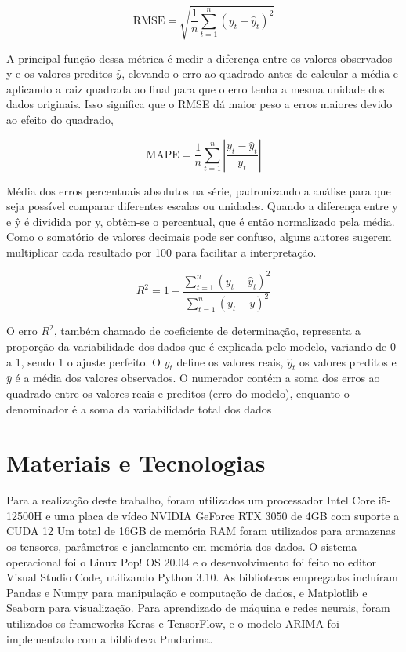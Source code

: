 \begin{equation}
    \text{RMSE} = \sqrt{\frac{1}{n} \sum_{t=1}^{n} (y_t - \hat{y}_t)^2}
\end{equation}

A principal função dessa métrica é medir a diferença entre os valores observados 
y e os valores preditos $\hat{y}$, elevando o erro ao quadrado antes de calcular a média e aplicando a raiz quadrada ao final para que o erro tenha a mesma unidade dos dados originais. Isso significa que o RMSE dá maior peso a erros maiores devido ao efeito do quadrado,

\begin{equation}
    \text{MAPE} = \frac{1}{n} \sum_{t=1}^{n} \left|\frac{y_t - \hat{y}_t}{y_t}\right|
\end{equation}

Média dos erros percentuais absolutos na série, padronizando a análise para que seja possível comparar diferentes escalas ou unidades.
Quando a diferença entre y e ŷ é dividida por y, obtêm-se o percentual, que é então normalizado pela média. Como o somatório de valores decimais pode ser confuso, alguns autores sugerem multiplicar cada resultado por 100 para facilitar a interpretação.

\begin{equation}
    R^2 = 1 - \frac{\sum_{t=1}^{n} (y_t - \hat{y}_t)^2}{\sum_{t=1}^{n}(y_t - \bar{y})^2}
\end{equation}

O erro $R^2$, também chamado de coeficiente de determinação, representa a proporção da variabilidade dos dados que é explicada pelo modelo, variando de 0 a 1, sendo 1 o ajuste perfeito.
O $y_t$ define os valores reais, $\hat{y}_t$ os valores preditos e $\bar{y}$ é a média dos valores observados. O numerador contém a soma dos erros ao quadrado entre os valores reais e preditos (erro do modelo), enquanto o denominador é a soma da variabilidade total dos dados

\section{Materiais e Tecnologias} \label{sec:materiais}
Para a realização deste trabalho, 
foram utilizados um processador Intel Core i5-12500H e
uma placa de vídeo NVIDIA GeForce RTX 3050 de 4GB com suporte a CUDA 12
Um total de 16GB de memória RAM foram utilizados para armazenas os tensores, parâmetros e janelamento em memória dos dados. 
O sistema operacional foi o Linux Pop! OS 20.04 e o desenvolvimento foi feito no editor Visual Studio Code, utilizando Python 3.10. As bibliotecas empregadas incluíram Pandas e Numpy para manipulação e computação de dados, e Matplotlib e Seaborn para visualização. Para aprendizado de máquina e redes neurais, foram utilizados os frameworks Keras e TensorFlow, e o modelo ARIMA foi implementado com a biblioteca Pmdarima.